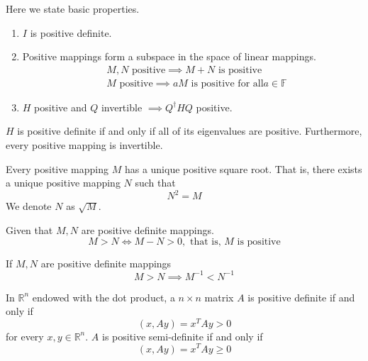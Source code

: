   \begin{theorem} 
    Here we state basic properties. 
    \begin{enumerate}
      \item $I$ is positive definite. 
      \item Positive mappings form a subspace in the space of linear mappings. 
      \begin{align*}
        &M, N \text{ positive} \implies M + N \text{ is positive} \\
        &M \text{ positive} \implies a M \text{ is positive for all} a \in \mathbb{F}
      \end{align*}
      \item $H$ positive and $Q$ invertible $\implies Q^\dagger H Q$ positive. 
    \end{enumerate}
  \end{theorem}

  \begin{theorem}
    $H$ is positive definite if and only if all of its eigenvalues are positive. Furthermore, every positive mapping is invertible.
  \end{theorem}

  \begin{theorem}
    Every positive mapping $M$ has a unique positive square root. That is, there exists a unique positive mapping $N$ such that
    \begin{equation}
      N^2 = M 
    \end{equation}
    We denote $N$ as $\sqrt{M}$. 
  \end{theorem}

  \begin{definition}
    Given that $M, N$ are positive definite mappings. 
    \begin{equation}
      M > N \iff M - N > 0, \text{ that is, $M$ is positive}
    \end{equation}
  \end{definition}

  \begin{theorem}
    If $M, N$ are positive definite mappings 
    \begin{equation}
       M > N \implies M^{-1} < N^{-1}
    \end{equation}
  \end{theorem}

  \begin{theorem}
    In $\mathbb{R}^n$ endowed with the dot product, a $n \times n$ matrix $A$ is positive definite if and only if 
    \begin{equation}
      (x, A y) = x^T A y > 0 
    \end{equation}
    for every $x, y \in \mathbb{R}^n$. $A$ is positive semi-definite if and only if 
    \begin{equation}
      (x, A y) = x^T A y \geq 0
    \end{equation}
  \end{theorem}

